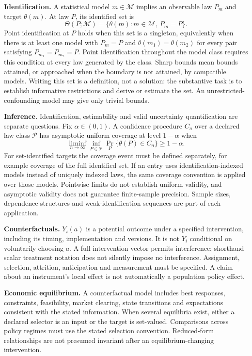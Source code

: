 \documentclass[11pt,a4paper]{article}
\begin{document}
\textbf{Identification.} A statistical model $m\in\mathcal M$ implies an observable law $P_m$ and target $\theta(m)$. At law $P$, its identified set is
\[
\Theta(P;\mathcal M)=\{\theta(m):m\in\mathcal M,\ P_m=P\}.
\]
Point identification at $P$ holds when this set is a singleton, equivalently when there is at least one model with $P_m=P$ and $\theta(m_1)=\theta(m_2)$ for every pair satisfying $P_{m_1}=P_{m_2}=P$. Point identification throughout the model class requires this condition at every law generated by the class. Sharp bounds mean bounds attained, or approached when the boundary is not attained, by compatible models. Writing this set is a definition, not a solution: the substantive task is to establish informative restrictions and derive or estimate the set. An unrestricted-confounding model may give only trivial bounds.

\textbf{Inference.} Identification, estimability and valid uncertainty quantification are separate questions. Fix $\alpha\in(0,1)$. A confidence procedure $C_n$ over a declared law class $\mathcal P$ has asymptotic uniform coverage at level $1-\alpha$ when
\[
\liminf_{n\to\infty}\inf_{P\in\mathcal P}\Pr_P\{\theta(P)\in C_n\}\geq1-\alpha.
\]
For set-identified targets the coverage event must be defined separately, for example coverage of the full identified set. If an entry uses identification-indexed models instead of uniquely indexed laws, the same coverage convention is applied over those models. Pointwise limits do not establish uniform validity, and asymptotic validity does not guarantee finite-sample precision. Sample sizes, dependence structures and weak-identification sequences are part of each application.

\textbf{Counterfactuals.} $Y_i(a)$ is a potential outcome under a specified intervention, including its timing, implementation and versions. It is not $Y_i$ conditional on voluntarily choosing $a$. A full intervention vector permits interference; shorthand scalar treatment notation does not silently impose no interference. Assignment, selection, attrition, anticipation and measurement must be specified. A claim about an instrument's local effect is not automatically a population policy effect.

\textbf{Economic equilibrium.} A counterfactual model includes best responses, constraints, feasibility, market clearing, state transitions and expectations consistent with the stated information. When several equilibria exist, either a declared selector is an input or the target is set-valued. Comparisons across policy regimes must use the stated selection convention. Reduced-form relationships are not presumed invariant after an equilibrium-changing intervention.
\end{document}
